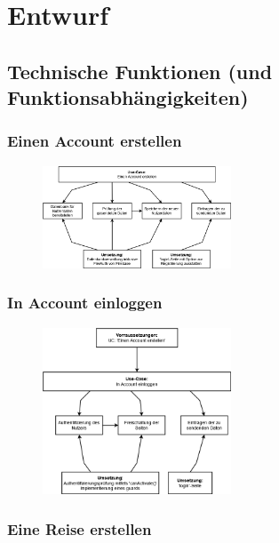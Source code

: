 \section{Entwurf}

\subsection{Technische Funktionen (und Funktionsabhängigkeiten)}

\subsubsection{Einen Account erstellen}

	\begin{figure}[H]
		\centering
		\includegraphics[width=0.5\textwidth]{img/diagrams/Anforderung-Registrieren}
	\end{figure}

\subsubsection{In Account einloggen}

	\begin{figure}[H]
		\centering
		\includegraphics[width=0.5\textwidth]{img/diagrams/Anforderung-Einloggen}
	\end{figure}

\subsubsection{Eine Reise erstellen}

